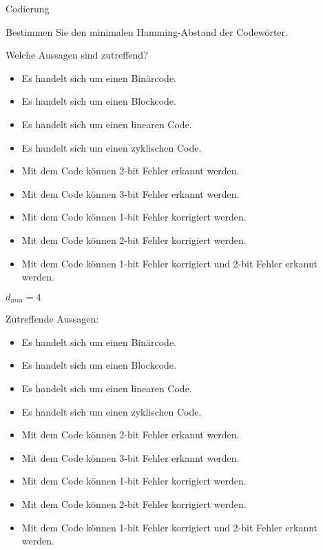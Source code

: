 \documentclass{exercisesheet}
\begin{document}
  \begin{exercise}{Codierung}
    \item Bestimmen Sie den minimalen Hamming-Abstand der Codewörter.
    \item Welche Aussagen sind zutreffend?
      \begin{itemize}
        \item Es handelt sich um einen Binärcode.
        \item Es handelt sich um einen Blockcode.
        \item Es handelt sich um einen linearen Code.
        \item Es handelt sich um einen zyklischen Code.
        \item Mit dem Code können 2-bit Fehler erkannt werden.
        \item Mit dem Code können 3-bit Fehler erkannt werden.
        \item Mit dem Code können 1-bit Fehler korrigiert werden.
        \item Mit dem Code können 2-bit Fehler korrigiert werden.
        \item Mit dem Code können 1-bit Fehler korrigiert und 2-bit Fehler erkannt werden.
      \end{itemize}
  \end{exercise}

  \begin{solution}
    \item $d_{min} = 4$
    \item Zutreffende Aussagen:
      \begin{itemize}
        \item Es handelt sich um einen Binärcode. \checkmark
        \item Es handelt sich um einen Blockcode. \checkmark
        \item Es handelt sich um einen linearen Code. \checkmark
        \item Es handelt sich um einen zyklischen Code. \checkmark
        \item Mit dem Code können 2-bit Fehler erkannt werden. \checkmark
        \item Mit dem Code können 3-bit Fehler erkannt werden. \checkmark
        \item Mit dem Code können 1-bit Fehler korrigiert werden. \checkmark
        \item Mit dem Code können 2-bit Fehler korrigiert werden. \xmark
        \item Mit dem Code können 1-bit Fehler korrigiert und 2-bit Fehler erkannt werden. \checkmark
      \end{itemize}
  \end{solution}
\end{document}
